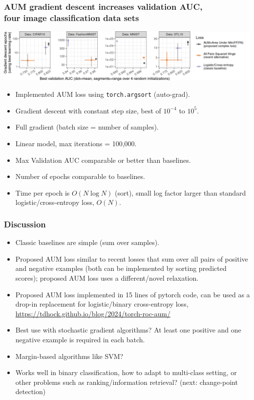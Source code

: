 \documentclass[t]{beamer}
\begin{document}
\begin{frame}
  \frametitle{AUM gradient descent increases validation AUC,\\
    four image classification data sets}
 
\includegraphics[width=\textwidth]{data_Classif_batchtools_best_valid_scatter}

\begin{itemize}
\item Implemented AUM loss using \texttt{torch.argsort} (auto-grad).
\item Gradient descent with constant step size, best of $10^{-4}$ to $10^5$.
\item Full gradient (batch size = number of samples).
\item Linear model, max iterations = 100,000.
\item Max Validation AUC comparable or better than baselines.
\item Number of epochs comparable to baselines.
\item Time per epoch is $O(N \log N)$ (sort), small log factor larger than standard logistic/cross-entropy loss, $O(N)$.
\end{itemize}

\end{frame}

\begin{frame}
  \frametitle{Discussion}
  \begin{itemize}
  \item Classic baselines are simple (sum over samples).
  \item Proposed AUM loss similar to recent losses that sum over all
    pairs of positive and negative examples (both can be implemented
    by sorting predicted scores); proposed AUM loss uses a
    different/novel relaxation.
  \item Proposed AUM loss implemented in 15 lines of pytorch code, can be used as a drop-in replacement for logistic/binary cross-entropy loss, \url{https://tdhock.github.io/blog/2024/torch-roc-aum/}
  \item Best use with stochastic gradient algorithms?
    At least one positive and one negative example is required in each
    batch.
  \item Margin-based algorithms like SVM?
  \item Works well in binary classification, how to adapt to
    multi-class setting, or other problems such as ranking/information
    retrieval? (next: change-point detection)
  \end{itemize}
\end{frame}
\end{document}
